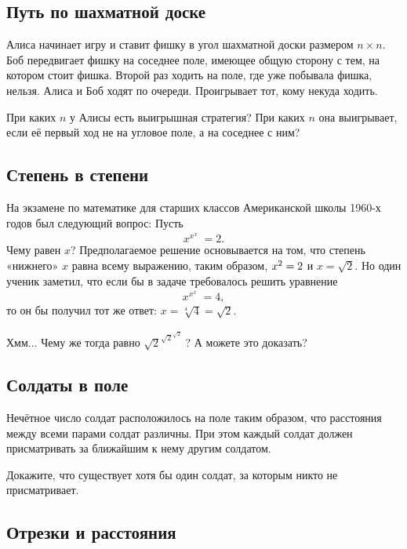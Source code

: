 \subsection*{Путь по шахматной доске} %

Алиса начинает игру и ставит фишку в угол шахматной доски размером $n{\times}n$.
Боб передвигает фишку на соседнее поле, имеющее общую сторону с тем, на котором стоит фишка.
Второй раз ходить на поле, где уже побывала фишка, нельзя. 
Алиса и Боб ходят по очереди.
Проигрывает тот, кому некуда ходить.

При каких $n$ у Алисы есть выигрышная стратегия? 
При каких $n$ она выигрывает, если её первый ход не на угловое поле, а на соседнее с ним?

\subsection*{Степень в степени} %

На экзамене по математике для старших классов Американской школы 1960-х годов 
был следующий вопрос:
Пусть
$$x^{x^{x^{{\cdot}^{\cdot^{\cdot}}}}}=2.$$
Чему равен $x$? 
Предполагаемое решение основывается на том, что степень «нижнего» $x$ равна всему выражению, таким образом, $x^2\z=2$ и $x=\sqrt{2}$.
Но один ученик заметил, что если бы в задаче требовалось решить уравнение
$$x^{x^{x^{{\cdot}^{\cdot^{\cdot}}}}}=4,$$
то он бы получил тот же ответ: $x=\sqrt[4]{4}=\sqrt{2}$.

Хмм...
Чему же тогда равно ${\sqrt{2}}^{{\sqrt{2}}^{{\sqrt{2}}^{{\cdot}^{\cdot^{\cdot}}}}}$? 
А можете это доказать?

\subsection*{Солдаты в поле} %

Нечётное число солдат расположилось на поле таким образом, что расстояния между всеми парами солдат различны.
При этом каждый солдат должен присматривать за ближайшим к нему другим солдатом.

Докажите, что существует хотя бы один солдат, за которым никто не присматривает.

\subsection*{Отрезки и расстояния} %

